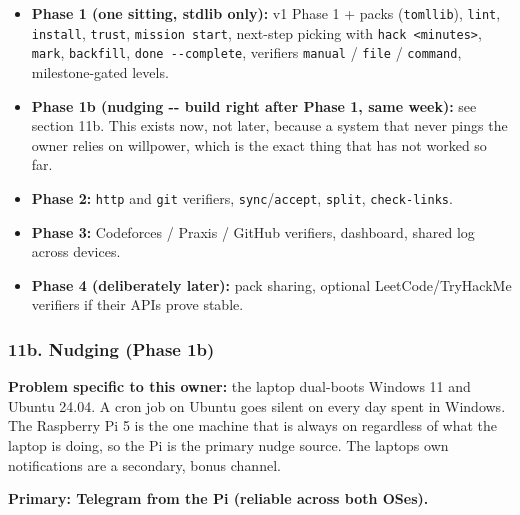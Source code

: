 \begin{itemize}
\tightlist
\item
  \textbf{Phase 1 (one sitting, stdlib only):} v1 Phase 1 + packs
  (\texttt{tomllib}), \texttt{lint}, \texttt{install}, \texttt{trust},
  \texttt{mission start}, next-step picking with
  \texttt{hack \textless{}minutes\textgreater{}}, \texttt{mark},
  \texttt{backfill}, \texttt{done -\/-complete}, verifiers
  \texttt{manual} / \texttt{file} / \texttt{command}, milestone-gated
  levels.
\item
  \textbf{Phase 1b (nudging -\/- build right after Phase 1, same week):}
  see section 11b. This exists now, not later, because a system that
  never pings the owner relies on willpower, which is the exact thing
  that has not worked so far.
\item
  \textbf{Phase 2:} \texttt{http} and \texttt{git} verifiers,
  \texttt{sync}/\texttt{accept}, \texttt{split}, \texttt{check-links}.
\item
  \textbf{Phase 3:} Codeforces / Praxis / GitHub verifiers, dashboard,
  shared log across devices.
\item
  \textbf{Phase 4 (deliberately later):} pack sharing, optional
  LeetCode/TryHackMe verifiers if their APIs prove stable.
\end{itemize}

\hypertarget{hackstreak-spec-v2-11b-nudging-phase-1b}{%
\subsubsection{11b. Nudging (Phase 1b)}\label{hackstreak-spec-v2-11b-nudging-phase-1b}}

\textbf{Problem specific to this owner:} the laptop dual-boots Windows
11 and Ubuntu 24.04. A cron job on Ubuntu goes silent on every day spent
in Windows. The Raspberry Pi 5 is the one machine that is always on
regardless of what the laptop is doing, so the Pi is the primary nudge
source. The laptop\textquotesingle s own notifications are a secondary,
bonus channel.

\textbf{Primary: Telegram from the Pi (reliable across both OSes).}

